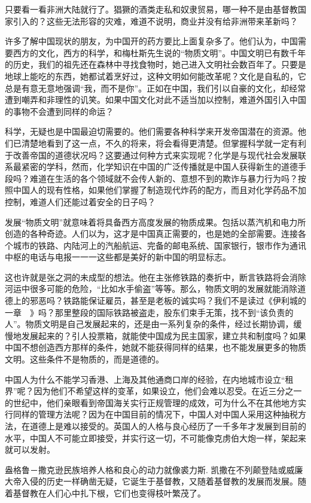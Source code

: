 \documentclass[12pt,oneside]{book}
\begin{document}
\begin{common-format}
只要看一看非洲大陆就行了。猖獗的酒类走私和奴隶贸易，哪一种不是由基督教国家引入的？这些无法形容的灾难，难道不说明，商业并没有给非洲带来革新吗？ 

许多了解中国现状的朋友，为中国开的药方要比上面复杂多了。他们认为，中国需要西方的文化，西方的科学，和梅杜斯先生说的“物质文明”。中国文明已有数千年的历史，我们的祖先还在森林中寻找食物时，她己进入文明社会数百年了。只要是地球上能吃的东西，她都试着烹好过，这种文明如何能改革呢？文化是自私的，它总是有意无意地强调“我，而不是你”。正如在中国，我们引以自豪的文化，却经常遭到嘲弄和非理性的讥笑。如果中国文化对此不适当加以控制，难道外国引入中国的事物不会遭到同样的命运？ 

科学，无疑也是中国最迫切需要的。他们需要各种科学来开发帝国潜在的资源。他们已清楚地看到了这一点，不久的将来，将会看得更清楚。但掌握科学就一定有利于改善帝国的道德状况吗？这要通过何种方式来实现呢？化学是与现代社会发展联系最紧密的学科，然而，化学知识在中国的广泛传播就是中国人获得新生的道德手段吗？难道在生活的各个领域就不会传人新的、意想不到的欺诈与暴力行为吗？按照中国人的现有性格，如果他们掌握了制造现代炸药的配方，而且对化学药品不加控制，难道人们还能过着安全的日子吗？ 

发展“物质文明”就意味着将具备西方高度发展的物质成果。包括以蒸汽机和电力所创造的各种奇迹。人们以为，这才是中国真正需要的，也是她的全部需要。连接各个城市的铁路、内陆河上的汽船航运、完备的邮电系统、国家银行，银市作为通讯中枢的电话与电报一一一这些都是美好的新中国的明显标志。 

这也许就是张之洞的未成型的想法。他在主张修铁路的奏折中，断言铁路将会消除河运中很多可能的危险，“比如水手偷盗”等等。那么，物质文明的发展就能消除道德上的邪恶吗？铁路能保证雇员，甚至是老板的诚实吗？我们不是读过《伊利城的一章　》吗？那里整段的国际铁路被盗走，股东们束手无策，找不到“该负责的人”。物质文明是自己发展起来的，还是由一系列复杂的条件，经过长期协调，缓慢地发展起来的？引人投票箱，就能使中国成为民主国家，建立共和制度吗？如果中国不想创造西方那样的条件，她就不能获得同样的结果，也不能发展更多的物质文明。这些条件不是物质的，而是道德的。 

中国人为什么不能学习香港、上海及其他通商口岸的经验，在内地城市设立“租界”呢？因为他们不希望这样的变革，如果设立，他们会难以忍受。在近三分之一的世纪中，他们亲眼看到帝国海关实行正规管理的成效，可为什么不在其他地方实行同样的管理方法呢？因为在中国目前的情况下，中国人对中国人采用这种抽税方法，在道德上是难以接受的。英国人的人格与良心经历了一千多年才发展到目前的水平，中国人不可能立即接受，并实行这一切，不可能像克虏伯大炮一样，架起来就可以发射。 

盎格鲁－撒克逊民族培养人格和良心的动力就像裘力斯. 凯撒在不列颠登陆或威廉大帝入侵的历史一样确凿无疑，它诞生于基督教，又随着基督教的发展而发展。随着基督教在人们心中扎下根，它们也变得枝叶繁茂了。 


\end{common-format}
\end{document}
